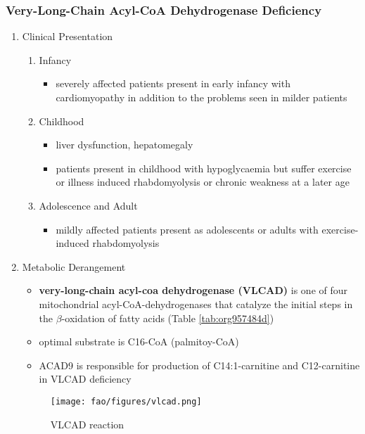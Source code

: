 \documentclass[12pt]{scrartcl}
\begin{document}
\subsubsection{Very-Long-Chain Acyl-CoA Dehydrogenase Deficiency}
\label{sec:org58b786a}
\begin{enumerate}
\item Clinical Presentation
\label{sec:org10f2ff0}
\begin{enumerate}
\item Infancy
\label{sec:orgcd13a83}
\begin{itemize}
\item severely affected patients present in early infancy with
cardiomyopathy in addition to the problems seen in milder patients
\end{itemize}
\item Childhood
\label{sec:org99a13fe}
\begin{itemize}
\item liver dysfunction, hepatomegaly
\item patients present in childhood with hypoglycaemia but suffer exercise
or illness induced rhabdomyolysis or chronic weakness at a later age
\end{itemize}
\item Adolescence and Adult
\label{sec:orge306bc7}
\begin{itemize}
\item mildly affected patients present as adolescents or adults with
exercise-induced rhabdomyolysis
\end{itemize}
\end{enumerate}
\item Metabolic Derangement
\label{sec:org34f5e23}
\begin{itemize}
\item \textbf{very-long-chain acyl-coa dehydrogenase (VLCAD)} is one of four
mitochondrial acyl-CoA-dehydrogenases that catalyze the initial
steps in the \(\beta\)-oxidation of fatty acids (Table \ref{tab:org957484d})
\item optimal substrate is C16-CoA (palmitoy-CoA)
\item ACAD9 is responsible for production of C14:1-carnitine and
C12-carnitine in VLCAD deficiency
\end{itemize}

\begin{figure}[htbp]
\centering
\texttt{[image: fao/figures/vlcad.png]}
\caption{\label{fig:orgdbbcc67}VLCAD reaction}
\end{figure}


\end{enumerate}
\end{document}
